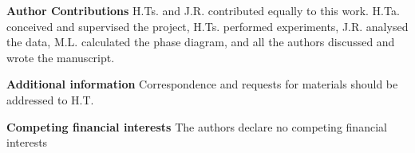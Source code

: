 \documentclass[preprint,amsmath,amssymb,superscriptaddress]{revtex4-1}
\begin{document}
\vspace{0.3cm}
\noindent
{\bf Author Contributions} 
H.Ts. and J.R. contributed equally to this work. 
H.Ta. conceived and supervised the project, H.Ts. performed experiments, J.R. analysed the data, M.L. calculated the phase diagram, and all the authors discussed and wrote the manuscript. 

\vspace{0.3cm}
\noindent
{\bf Additional information} 
Correspondence and requests for materials should be addressed to H.T. 

\vspace{0.3cm}
\noindent
{\bf Competing financial interests}
The authors declare no competing financial interests


\clearpage
\end{document}
